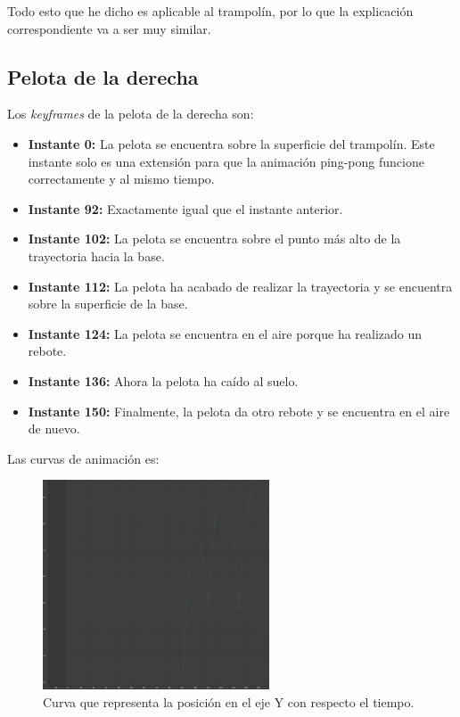 \documentclass{article}
\begin{document}
\bigskip

Todo esto que he dicho es aplicable al trampolín, por lo que la explicación correspondiente va a ser muy similar.


\subsection{Pelota de la derecha}
Los \textit{keyframes} de la pelota de la derecha son:

\begin{itemize}
    \item \textbf{Instante 0: }La pelota se encuentra sobre la superficie del trampolín. Este instante solo es una extensión para que la animación ping-pong funcione correctamente y al mismo tiempo.
    \item \textbf{Instante 92: }Exactamente igual que el instante anterior.
    \item \textbf{Instante 102: }La pelota se encuentra sobre el punto más alto de la trayectoria hacia la base.
    \item \textbf{Instante 112: }La pelota ha acabado de realizar la trayectoria y se encuentra sobre la superficie de la base.
    \item \textbf{Instante 124: }La pelota se encuentra en el aire porque ha realizado un rebote.
    \item \textbf{Instante 136: }Ahora la pelota ha caído al suelo.
    \item \textbf{Instante 150: }Finalmente, la pelota da otro rebote y se encuentra en el aire de nuevo.
\end{itemize}

Las curvas de animación es:

\begin{figure}[H]
    \centering
    \includegraphics[width=0.6\textwidth]{imagenes/curvas/PR/pelota/green.png}
    \caption{Curva que representa la posición en el eje Y con respecto el tiempo.}
 \end{figure}
\end{document}
